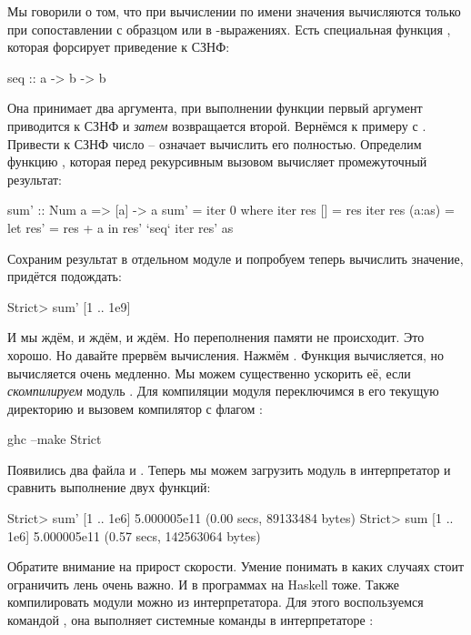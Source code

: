 Мы говорили о том, что при вычислении по имени значения вычисляются
только при сопоставлении с образцом или в -выражениях. Есть
специальная функция , которая форсирует приведение к СЗНФ:


\begin{code}
seq :: a -> b -> b
\end{code}

Она принимает два аргумента, при выполнении функции первый аргумент
приводится к СЗНФ и \emph{затем} возвращается второй. Вернёмся к примеру
с . Привести к СЗНФ число -- означает вычислить его полностью.
Определим функцию , которая перед рекурсивным вызовом вычисляет
промежуточный результат:


\begin{code}
sum' :: Num a => [a] -> a
sum' = iter 0 
    where iter res []        = res
          iter res (a:as)    = let res' = res + a
                               in  res' `seq` iter res' as 
\end{code}

Сохраним результат в отдельном модуле  и попробуем теперь
вычислить значение, придётся подождать:


\begin{code}
Strict> sum' [1 .. 1e9]
\end{code}

И мы ждём, и ждём, и ждём. Но переполнения памяти не происходит. Это
хорошо. Но давайте прервём вычисления. Нажмём . Функция
 вычисляется, но вычисляется очень медленно. Мы можем
существенно ускорить её, если \emph{скомпилируем} модуль .
Для компиляции модуля переключимся в его текущую директорию и вызовем
компилятор  с флагом :


\begin{code}
ghc --make Strict
\end{code}

Появились два файла  и . Теперь мы можем
загрузить модуль  в интерпретатор и сравнить выполнение двух
функций:


\begin{code}
Strict> sum' [1 .. 1e6]
5.000005e11
(0.00 secs, 89133484 bytes)
Strict> sum [1 .. 1e6]
5.000005e11
(0.57 secs, 142563064 bytes)
\end{code}

Обратите внимание на прирост скорости. Умение понимать в каких случаях
стоит ограничить лень очень важно. И в программах на Haskell тоже. Также
компилировать модули можно из интерпретатора. Для этого воспользуемся
командой \In{:!}, она выполняет системные команды в интерпретаторе
:


